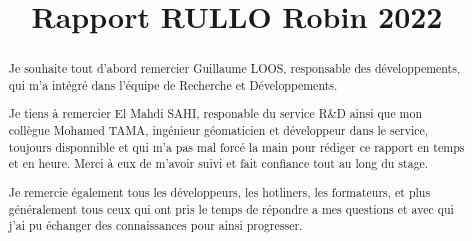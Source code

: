 \documentclass{rapportUHA40}
\title{Rapport RULLO Robin 2022} %
\begin{document}









\fairepagedegarde%
\fairemarges%



\begin{center}
  \begin{abstract}
    Je souhaite tout d’abord remercier Guillaume LOOS, responsable des
    développements, qui m'a intégré dans l'équipe de Recherche et Développements.

    Je tiens à remercier El Mahdi SAHI, responable du service R\&D ainsi que mon
    collègue Mohamed TAMA, ingénieur géomaticien et développeur dans le service,
    toujours disponnible et qui m'a pas mal forcé la main pour rédiger ce rapport
    en temps et en heure. Merci à eux de m’avoir suivi et fait confiance tout au
    long du stage.

    Je remercie également tous les développeurs, les hotliners, les formateurs, et
    plus généralement tous ceux qui ont pris le temps de répondre a mes questions
    et avec qui j'ai pu échanger des connaissances pour ainsi progresser.
  \end{abstract}
\end{center}
\newpage
\end{document}

